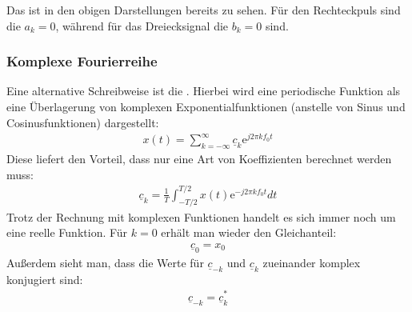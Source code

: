 \documentclass[letterpaper,10pt,english]{jupyterBook}
\begin{document}
\sphinxAtStartPar
Das ist in den obigen Darstellungen bereits zu sehen. Für den Rechteckpuls sind die \(a_k = 0\), während für das Dreiecksignal die \(b_k = 0\) sind.


\subsubsection{Komplexe Fourierreihe}
\label{\detokenize{content/3_FourierAnalyse:komplexe-fourierreihe}}
\sphinxAtStartPar
Eine alternative Schreibweise ist die . Hierbei wird eine periodische Funktion als eine Überlagerung von komplexen Exponentialfunktionen (anstelle von Sinus\sphinxhyphen{} und Cosinusfunktionen) dargestellt:
\begin{equation*}
\begin{split}x(t) = \sum_{k=-\infty}^{\infty} \underline{c}_k \mathrm e^{j 2\pi k f_0 t}\end{split}
\end{equation*}
\sphinxAtStartPar
Diese liefert den Vorteil, dass nur eine Art von Koeffizienten berechnet werden muss:
\begin{equation*}
\begin{split}\underline {c}_k = \frac{1}{T}  \int_{-T/2}^{T/2} x(t) \mathrm e^{- j 2\pi k f_0 t} dt \end{split}
\end{equation*}
\sphinxAtStartPar
Trotz der Rechnung mit komplexen Funktionen handelt es sich immer noch um eine reelle Funktion. Für \(k=0\) erhält man wieder den Gleichanteil:
\begin{equation*}
\begin{split}\underline c_0 = x_0\end{split}
\end{equation*}
\sphinxAtStartPar
Außerdem sieht man, dass die Werte für \(\underline {c}_{-k}\) und \(\underline {c}_k\) zueinander komplex konjugiert sind:
\begin{equation*}
\begin{split}\underline {c}_{-k} = \underline {c}_k^*\end{split}
\end{equation*}
\end{document}
